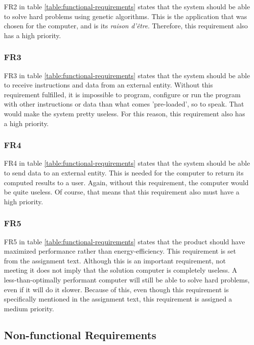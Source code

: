 FR2 in table \vref{table:functional-requirements} states that the system should be able to solve hard problems using genetic algorithms.
This is the application that was chosen for the computer, and is its \textit{raison d'être}.
Therefore, this requirement also has a high priority.

\subsubsection{FR3}

FR3 in table \vref{table:functional-requirements} states that the system should be able to receive instructions and data from an external entity.
Without this requirement fulfilled, it is impossible to program, configure or run the program with other instructions or data than what comes 'pre-loaded', so to speak.
That would make the system pretty useless.
For this reason, this requirement also has a high priority.

\subsubsection{FR4}

FR4 in table \vref{table:functional-requirements} states that the system should be able to send data to an external entity.
This is needed for the computer to return its computed results to a user.
Again, without this requirement, the computer would be quite useless.
Of course, that means that this requirement also must have a high priority.

\subsubsection{FR5}

FR5 in table \vref{table:functional-requirements} states that the product should have maximized performance rather than energy-efficiency.
This requirement is set from the assignment text.
Although this is an important requirement, not meeting it does not imply that the solution computer is completely useless.
A less-than-optimally performant computer will still be able to solve hard problems, even if it will do it slower.
Because of this, even though this requirement is specifically mentioned in the assignment text, this requirement is assigned a medium priority.

\subsection{Non-functional Requirements}

